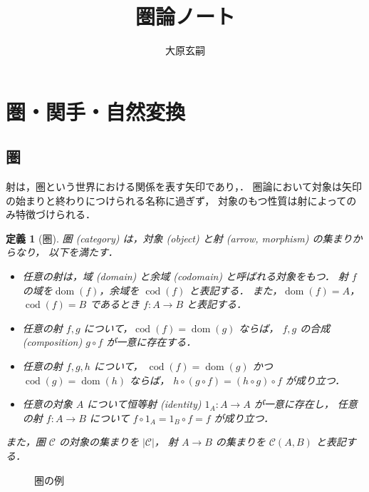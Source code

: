 \documentclass[titlepage]{ltjsarticle}
\title{圏論ノート}
\author{大原玄嗣}
\newcommand{\cat}[1]{\mathscr{#1}}
\newcommand{\obj}[1]{|#1|}
\newcommand{\mrp}[3]{#1(#2,#3)}
\DeclareMathOperator{\dom}{dom}
\DeclareMathOperator{\cod}{cod}
\theoremstyle{plain}
\newtheorem{definition}{定義}[section]
\begin{document}
\maketitle

\section{圏・関手・自然変換}

\subsection{圏}

射は，圏という世界における関係を表す矢印であり，．
圏論において対象は矢印の始まりと終わりにつけられる名称に過ぎず，
対象のもつ性質は射によってのみ特徴づけられる．

\begin{definition}[圏]\label{def:category}
  圏 (category) は，対象 (object) と射 (arrow, morphism) の集まりからなり，
  以下を満たす．
  \begin{itemize}
    \item 任意の射は，域 (domain) と余域 (codomain) と呼ばれる対象をもつ．
          射 $f$ の域を$\dom(f)$，余域を $\cod(f)$ と表記する．
          また，$\dom(f)=A$，$\cod(f)=B$ であるとき $f:A\to B$ と表記する．
    \item 任意の射 $f,g$ について，$\cod(f)=\dom(g)$ ならば，
          $f,g$ の合成 (composition) $g\circ f$ が一意に存在する．
    \item 任意の射 $f,g,h$ について，
          $\cod(f)=\dom(g)$ かつ $\cod(g)=\dom(h)$ ならば，
          $h\circ(g\circ f)=(h\circ g)\circ f$ が成り立つ．
    \item 任意の対象 $A$ について恒等射 (identity) $1_A:A\to A$ が一意に存在し，
          任意の射 $f:A\to B$ について $f\circ 1_A=1_B\circ f=f$ が成り立つ．
  \end{itemize}
  また，圏 $\cat{C}$ の対象の集まりを $\obj{\cat{C}}$，
  射 $A\to B$ の集まりを $\mrp{\cat{C}}{A}{B}$ と表記する．
\end{definition}

\begin{figure}[htbp]
  \centering
  \caption{圏の例}
\end{figure}
\end{document}
